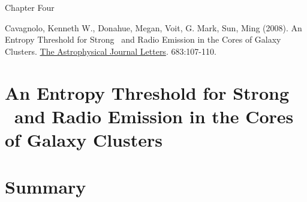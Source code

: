 \documentclass[final]{msuthesis}
\begin{document}



\newpage
\parbox[c][0.9\textheight][c]{\linewidth}{
\begin{center}
Chapter Four
\end{center}
\begin{spacing}{1.1}
Cavagnolo, Kenneth W., Donahue, Megan, Voit, G. Mark, Sun, Ming
(2008). An Entropy Threshold for Strong \halpha\ and Radio Emission in
the Cores of Galaxy Clusters. {\underline{The Astrophysical
Journal Letters}}. 683:107-110.\\
\end{spacing}
}

\chapter{An Entropy Threshold for Strong \halpha\ and Radio Emission
in the Cores of Galaxy Clusters}
\label{ch:harad}



\chapter{Summary}
\label{ch:summary}




\appendix









\end{document}
